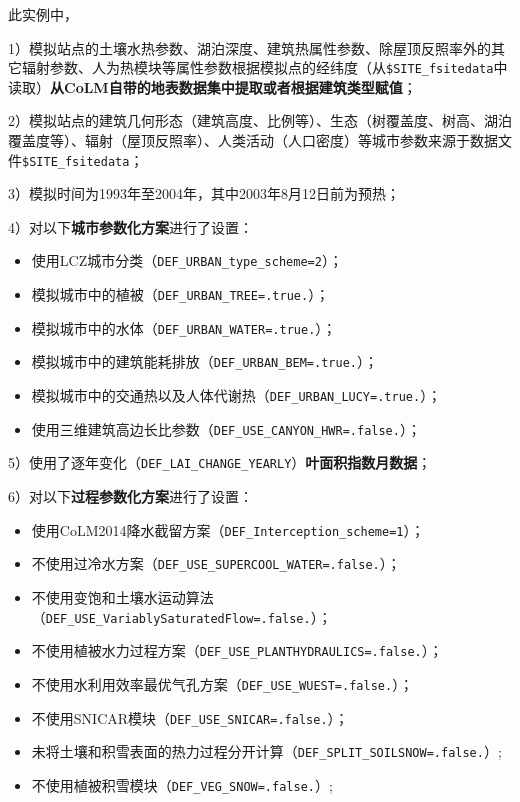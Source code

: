 此实例中，\par
1）模拟站点的土壤水热参数、湖泊深度、建筑热属性参数、除屋顶反照率外的其它辐射参数、人为热模块等属性参数根据模拟点的经纬度（从\texttt{\$SITE\_fsitedata}中读取）\textbf{从CoLM自带的地表数据集中提取或者根据建筑类型赋值}；\par
2）模拟站点的建筑几何形态（建筑高度、比例等）、生态（树覆盖度、树高、湖泊覆盖度等）、辐射（屋顶反照率）、人类活动（人口密度）等城市参数来源于数据文件\texttt{\$SITE\_fsitedata}；\par
3）模拟时间为1993年至2004年，其中2003年8月12日前为预热；\par
4）对以下\textbf{城市参数化方案}进行了设置：
\begin{itemize}[nosep,leftmargin=4em]
    \item 使用LCZ城市分类（\texttt{DEF\_URBAN\_type\_scheme=2}）；
    \item 模拟城市中的植被（\texttt{DEF\_URBAN\_TREE=.true.}）；
    \item 模拟城市中的水体（\texttt{DEF\_URBAN\_WATER=.true.}）；
    \item 模拟城市中的建筑能耗排放（\texttt{DEF\_URBAN\_BEM=.true.}）；
    \item 模拟城市中的交通热以及人体代谢热（\texttt{DEF\_URBAN\_LUCY=.true.}）；
    \item 使用三维建筑高边长比参数（\texttt{DEF\_USE\_CANYON\_HWR=.false.}）；
\end{itemize} \par
5）使用了逐年变化（\texttt{DEF\_LAI\_CHANGE\_YEARLY}）\textbf{叶面积指数月数据}；\par
6）对以下\textbf{过程参数化方案}进行了设置：
\begin{itemize}[nosep,leftmargin=4em]
    \item 使用CoLM2014降水截留方案（\texttt{DEF\_Interception\_scheme=1}）；
    \item 不使用过冷水方案（\texttt{DEF\_USE\_SUPERCOOL\_WATER=.false.}）；
    \item 不使用变饱和土壤水运动算法（\texttt{DEF\_USE\_VariablySaturatedFlow=.false.}）；
    \item 不使用植被水力过程方案（\texttt{DEF\_USE\_PLANTHYDRAULICS=.false.}）；
    \item 不使用水利用效率最优气孔方案（\texttt{DEF\_USE\_WUEST=.false.}）；
    \item 不使用SNICAR模块（\texttt{DEF\_USE\_SNICAR=.false.}）；
    \item 未将土壤和积雪表面的热力过程分开计算（\texttt{DEF\_SPLIT\_SOILSNOW=.false.}）;
    \item 不使用植被积雪模块（\texttt{DEF\_VEG\_SNOW=.false.}）;
\end{itemize}
